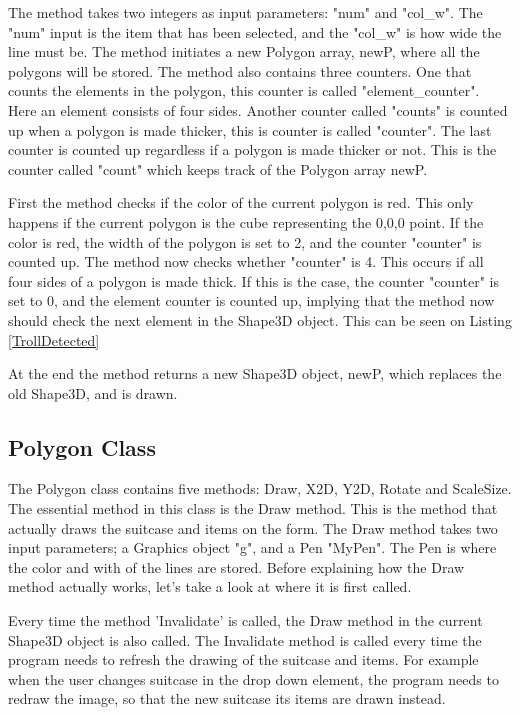The method takes two integers as input parameters: "num" and "col\_w". The "num" input is the item that has been selected, and the "col\_w" is how wide the line must be. The method initiates a new Polygon array, newP, where all the polygons will be stored. The method also contains three counters. One that counts the elements in the polygon, this counter is called "element\_counter". Here an element consists of four sides. Another counter called "counts" is counted up when a polygon is made thicker, this is counter is called "counter". The last counter is counted up regardless if a polygon is made thicker or not. This is the counter called "count" which keeps track of the Polygon array newP.

First the method checks if the color of the current polygon is red. This only happens if the current polygon is the cube representing the 0,0,0 point. If the color is red, the width of the polygon is set to 2, and the counter "counter" is counted up. The method now checks whether "counter" is 4. This occurs if all four sides of a polygon is made thick. If this is the case, the counter "counter" is set to 0, and the element counter is counted up, implying that the method now should check the next element in the Shape3D object. This can be seen on Listing \ref{TrollDetected}


At the end the method returns a new Shape3D object, newP, which replaces the old Shape3D, and is drawn.

\subsection{Polygon Class} 
The Polygon class contains five methods: Draw, X2D, Y2D, Rotate and ScaleSize. The essential method in this class is the Draw method. This is the method that actually draws the suitcase and items on the form. The Draw method takes two input parameters; a Graphics object "g", and a Pen "MyPen". The Pen is where the color and with of the lines are stored. Before explaining how the Draw method actually works, let's take a look at where it is first called. 

Every time the method 'Invalidate' is called, the Draw method in the current Shape3D object is also called. The Invalidate method is called every time the program needs to refresh the drawing of the suitcase and items. For example when the user changes suitcase in the drop down element, the program needs to redraw the image, so that the new suitcase its items are drawn instead. 

